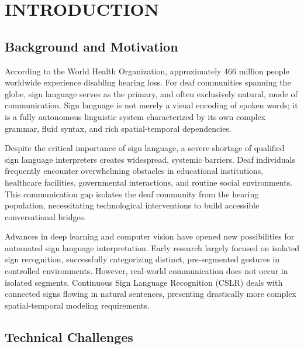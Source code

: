 \chapter{INTRODUCTION}

\section{Background and Motivation}

According to the World Health Organization, approximately 466 million people worldwide experience disabling hearing loss. For deaf communities spanning the globe, sign language serves as the primary, and often exclusively natural, mode of communication. Sign language is not merely a visual encoding of spoken words; it is a fully autonomous linguistic system characterized by its own complex grammar, fluid syntax, and rich spatial-temporal dependencies.

Despite the critical importance of sign language, a severe shortage of qualified sign language interpreters creates widespread, systemic barriers. Deaf individuals frequently encounter overwhelming obstacles in educational institutions, healthcare facilities, governmental interactions, and routine social environments. This communication gap isolates the deaf community from the hearing population, necessitating technological interventions to build accessible conversational bridges.

Advances in deep learning and computer vision have opened new possibilities for automated sign language interpretation. Early research largely focused on isolated sign recognition, successfully categorizing distinct, pre-segmented gestures in controlled environments. However, real-world communication does not occur in isolated segments. Continuous Sign Language Recognition (CSLR) deals with connected signs flowing in natural sentences, presenting drastically more complex spatial-temporal modeling requirements. 

\section{Technical Challenges}


